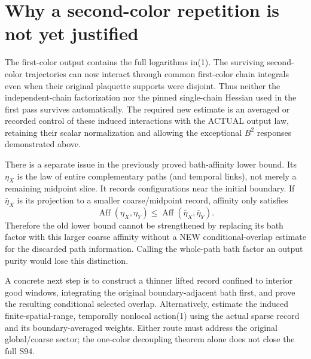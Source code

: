 \documentclass{article}
\begin{document}
\section*{Why a second-color repetition is not yet justified}
The first-color output contains the full logarithms in(1). The surviving second-color trajectories can now interact through common first-color chain integrals even when their original plaquette supports were disjoint. Thus neither the independent-chain factorization nor the pinned single-chain Hessian used in the first pass survives automatically. The required new estimate is an averaged or recorded control of these induced interactions with the ACTUAL output law, retaining their scalar normalization and allowing the exceptional $B^2$ responses demonstrated above.

There is a separate issue in the previously proved bath-affinity lower bound. Its $\eta_X$ is the law of entire complementary paths (and temporal links), not merely a remaining midpoint slice. It records configurations near the initial boundary. If $\bar\eta_X$ is its projection to a smaller coarse/midpoint record, affinity only satisfies
\[
 \operatorname{Aff}(\eta_X,\eta_Y)
 \le\operatorname{Aff}(\bar\eta_X,\bar\eta_Y).          \tag{5}
\]
Therefore the old lower bound cannot be strengthened by replacing its bath factor with this larger coarse affinity without a NEW conditional-overlap estimate for the discarded path information. Calling the whole-path bath factor an output purity would lose this distinction.

A concrete next step is to construct a thinner lifted record confined to interior good windows, integrating the original boundary-adjacent bath first, and prove the resulting conditional selected overlap. Alternatively, estimate the induced finite-spatial-range, temporally nonlocal action(1) using the actual sparse record and its boundary-averaged weights. Either route must address the original global/coarse sector; the one-color decoupling theorem alone does not close the full S94.
\end{document}
